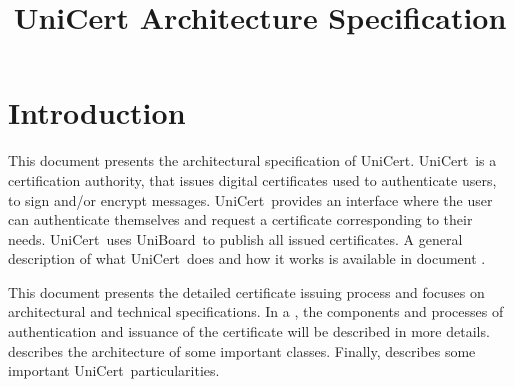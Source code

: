 \documentclass[oneside]{scrreprt}
\newcommand{\uniboard}{\mbox{UniBoard}}
\newcommand{\unicert}{\mbox{UniCert}}
\begin{document}
\lstset{
  language=Java,
  basicstyle=\footnotesize\sffamily, %
  keywordstyle=\bfseries,
  numbers=right
}

\title{UniCert Architecture Specification}
\maketitle

\begin{versionhistory}
\end{versionhistory}




\tableofcontents

\chapter{Introduction}

This document presents the architectural specification of \unicert. \unicert\ is a certification authority, that issues digital certificates used to authenticate users, to sign and/or encrypt messages. \unicert\ provides an interface where the user can authenticate themselves and request a certificate corresponding to their needs. \unicert\ uses \uniboard\ to publish all issued certificates. A general description of what \unicert\ does and how it works is available in document \cite{univote_spec}. 

This document presents the detailed certificate issuing process and focuses on architectural and technical specifications. In a , the components and processes of authentication and issuance of the certificate will be described in more details.  describes the architecture of some important classes. Finally,  describes some important \unicert\ particularities.

\end{document}
